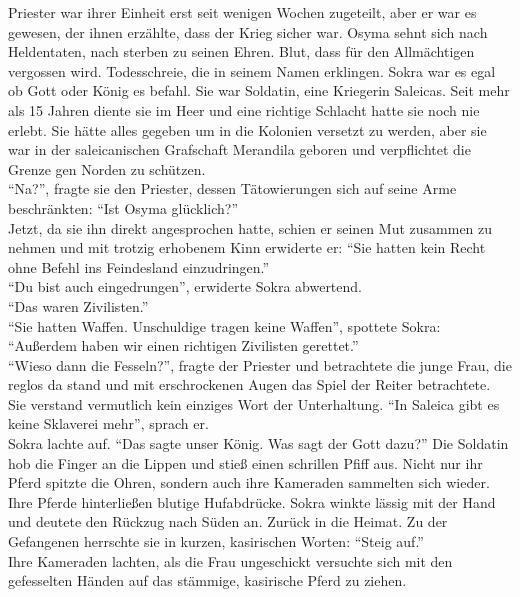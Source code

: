 Priester war ihrer Einheit erst seit wenigen Wochen zugeteilt, aber er war es gewesen, der ihnen 
erzählte, dass der Krieg sicher war. Osyma sehnt sich nach Heldentaten, nach sterben zu seinen 
Ehren. Blut, dass für den Allmächtigen vergossen wird. Todesschreie, die in seinem Namen erklingen. 
Sokra war es egal ob Gott oder König es befahl. Sie war Soldatin, eine Kriegerin Saleicas. Seit 
mehr als 15 Jahren diente sie im Heer und eine richtige Schlacht hatte sie noch nie erlebt. Sie 
hätte alles gegeben um in die Kolonien versetzt zu werden, aber sie war in der saleicanischen 
Grafschaft Merandila geboren und verpflichtet die Grenze gen Norden zu schützen.\\
``Na?'', fragte sie den Priester, dessen Tätowierungen sich auf seine Arme beschränkten: ``Ist 
Osyma glücklich?''\\
Jetzt, da sie ihn direkt angesprochen hatte, schien er seinen Mut zusammen zu nehmen und mit 
trotzig erhobenem Kinn erwiderte er: ``Sie hatten kein Recht ohne Befehl ins Feindesland 
einzudringen.''\\
``Du bist auch eingedrungen'', erwiderte Sokra abwertend.\\
``Das waren Zivilisten.''\\
``Sie hatten Waffen. Unschuldige tragen keine Waffen'', spottete Sokra: ``Außerdem haben wir einen 
richtigen Zivilisten gerettet.''\\
``Wieso dann die Fesseln?'', fragte der Priester und betrachtete die junge Frau, die reglos da 
stand und mit erschrockenen Augen das Spiel der Reiter betrachtete. Sie verstand vermutlich kein 
einziges Wort der Unterhaltung. ``In Saleica gibt es keine Sklaverei mehr'', sprach er.\\
Sokra lachte auf. ``Das sagte unser König. Was sagt der Gott dazu?''
Die Soldatin hob die Finger an die Lippen und stieß einen schrillen Pfiff aus. Nicht nur ihr Pferd 
spitzte die Ohren, sondern auch ihre Kameraden sammelten sich wieder. Ihre Pferde hinterließen 
blutige Hufabdrücke. Sokra winkte lässig mit der Hand und deutete den Rückzug nach Süden an. Zurück 
in die Heimat. Zu der Gefangenen herrschte sie in kurzen, kasirischen Worten: ``Steig auf.''\\
Ihre Kameraden lachten, als die Frau ungeschickt versuchte sich mit den gefesselten Händen auf das 
stämmige, kasirische Pferd zu ziehen. 

